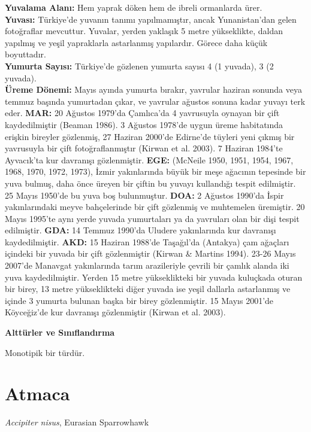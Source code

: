 \documentclass[
  letterpaper,
  DIV=11,
  numbers=noendperiod]{scrreprt}
\begin{document}
\textbf{Yuvalama Alanı:} Hem yaprak döken hem de ibreli ormanlarda
ürer.\\
\textbf{Yuvası:} Türkiye'de yuvanın tanımı yapılmamıştır, ancak
Yunanistan'dan gelen fotoğraflar mevcuttur. Yuvalar, yerden yaklaşık 5
metre yükseklikte, daldan yapılmış ve yeşil yapraklarla astarlanmış
yapılardır. Görece daha küçük boyuttadır.\\
\textbf{Yumurta Sayısı:} Türkiye'de gözlenen yumurta sayısı 4 (1
yuvada), 3 (2 yuvada).\\
\textbf{Üreme Dönemi:} Mayıs ayında yumurta bırakır, yavrular haziran
sonunda veya temmuz başında yumurtadan çıkar, ve yavrular ağustos sonuna
kadar yuvayı terk eder. \textbf{MAR:} 20 Ağustos 1979'da Çamlıca'da 4
yavrusuyla oynayan bir çift kaydedilmiştir (Beaman 1986). 3 Ağustos
1978'de uygun üreme habitatında erişkin bireyler gözlenmiş, 27 Haziran
2000'de Edirne'de tüyleri yeni çıkmış bir yavrusuyla bir çift
fotoğraflanmıştır (Kirwan et al. 2003). 7 Haziran 1984'te Ayvacık'ta kur
davranışı gözlenmiştir. \textbf{EGE:} (McNeile 1950, 1951, 1954, 1967,
1968, 1970, 1972, 1973), İzmir yakınlarında büyük bir meşe ağacının
tepesinde bir yuva bulmuş, daha önce üreyen bir çiftin bu yuvayı
kullandığı tespit edilmiştir. 25 Mayıs 1950'de bu yuva boş bulunmuştur.
\textbf{DOA:} 2 Ağustos 1990'da İspir yakınlarındaki meyve bahçelerinde
bir çift gözlenmiş ve muhtemelen üremiştir. 20 Mayıs 1995'te aynı yerde
yuvada yumurtaları ya da yavruları olan bir dişi tespit edilmiştir.
\textbf{GDA:} 14 Temmuz 1990'da Uludere yakınlarında kur davranışı
kaydedilmiştir. \textbf{AKD:} 15 Haziran 1988'de Taşağıl'da (Antakya)
çam ağaçları içindeki bir yuvada bir çift gözlenmiştir (Kirwan \&
Martins 1994). 23-26 Mayıs 2007'de Manavgat yakınlarında tarım
arazileriyle çevrili bir çamlık alanda iki yuva kaydedilmiştir. Yerden
15 metre yükseklikteki bir yuvada kuluçkada oturan bir birey, 13 metre
yükseklikteki diğer yuvada ise yeşil dallarla astarlanmış ve içinde 3
yumurta bulunan başka bir birey gözlenmiştir. 15 Mayıs 2001'de
Köyceğiz'de kur davranışı gözlenmiştir (Kirwan et al. 2003).

\textbf{Alttürler ve Sınıflandırma}

Monotipik bir türdür.

\section{Atmaca}\label{atmaca}

\emph{Accipiter nisus}, Eurasian Sparrowhawk
\end{document}
